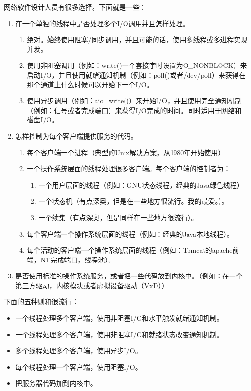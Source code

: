 \documentclass[12pt, twoside, a4paper, xetex]{report}
\begin{document}
网络软件设计人员有很多选择。下面就是一些：
	\begin{enumerate}
	
		\item 在一个单独的线程中是否处理多个I/O调用并且怎样处理。
		
			\begin{enumerate}
				\item 绝对。始终使用阻塞/同步调用，并且可能的话，使用多线程或多进程实现并发。
				\item 使用非阻塞调用（例如：write()一个套接字时设置为O\_NONBLOCK）来启动I/O，并且使用就绪通知机制（例如：poll()或者/dev/poll）来获得在那个通道上什么时候可以开始下一个I/O。
				\item 使用异步调用（例如：aio\_write()）来开始I/O，并且使用完全通知机制（例如：信号或者完成端口）来获得I/O完成的时间。同时适用于网络和磁盘I/O。
			\end{enumerate}
		\item 怎样控制为每个客户端提供服务的代码。
			\begin{enumerate}
				\item 每个客户端一个进程（典型的Unix解决方案，从1980年开始使用）
				\item 一个操作系统层面的线程处理很多客户端。每个客户端的控制者为：
				\begin{enumerate}
					\item  一个用户层面的线程（例如：GNU状态线程，经典的Java绿色线程）
					\item  一个状态机（有点深奥，但是在一些地方很流行。我的最爱。）。
					\item  一个续集（有点深奥，但是同样在一些地方很流行）。
				\end{enumerate}
				\item 每个客户端一个操作系统层面的线程（例如：经典的Java本地线程）。
				\item 每个活动的客户端一个操作系统层面的线程（例如：Tomcat的apache前端，NT完成端口，线程池）。
			\end{enumerate}
		\item 是否使用标准的操作系统服务，或者把一些代码放到内核中。（例如：在一个第三方驱动，内核模块或者虚拟设备驱动（VxD））
	\end{enumerate}
	
	
下面的五种则和很流行：
	\begin{itemize}
		\item 一个线程处理多个客户端，使用非阻塞I/O和水平触发就绪通知机制。
		\item 一个线程处理多个客户端，使用非阻塞I/O和就绪状态改变通知机制。
		\item 多个线程处理多个客户端，使用异步I/O。
		\item 每个线程处理一个客户端，使用阻塞I/O。
		\item 把服务器代码加到内核中。
	\end{itemize}
	
\end{document}

